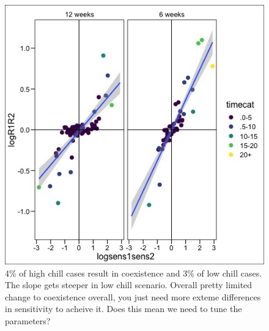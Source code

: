 \documentclass{article}
\begin{document}


\begin{figure}[h!]
  \centering
 \includegraphics[width=\textwidth]{..//plots/coexistance_runner.jpeg}
    \caption{4\% of high chill cases result in coexistence and 3\% of low chill cases. The slope gets steeper in low chill scenario. Overall pretty limited change to coexistence overall, you just need more exteme differences in sensitivity to acheive it. Does this mean we need to tune the parameters?}
    \label{Fig:coexistence}
\end{figure}
\end{document}
